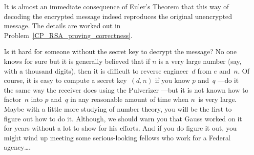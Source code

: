 It is almost an immediate consequence of Euler's Theorem that this way
of decoding the encrypted message indeed reproduces the original
unencrypted message.  The details are worked out in
Problem~\ref{CP_RSA_proving_correctness}.





\iffalse
In order to check that this is the
case, we need to show that the decryption
$\rem{(m^*)^d}{n}$ is indeed equal to the sender's message~$m$.  Since
$m^* = \rem{m^e}{n}$, \ $m^*$ is congruent to~$m^e$ modulo~$n$ by
Corollary~\ref{aran}.  That is,
\begin{equation*}
    m^* \equiv m^e \pmod n.
\end{equation*}
By raising both sides to the power~$d$, we obtain the congruence
\begin{equation}\label{eq:RSAx1}
    (m^*)^d \equiv m^{ed} \pmod n.
\end{equation}
The encryption exponent~$e$ and the decryption exponent~$d$ are chosen
such that $de \equiv 1 \pmod{(p - 1)(q - 1)}$.  So, there exists an
integer~$r$ such that $ed = 1 + r(p - 1)(q - 1)$.  By substituting $1
+ r(p - 1)(q - 1)$ for~$ed$ in Equation~\ref{eq:RSAx1}, we obtain
\begin{equation}\label{eq:RSAx2}
    (m^*)^d \equiv m \cdot m^{r(p - 1)(q - 1)} \pmod n.
\end{equation}

By Euler's Theorem and the assumption that $\gcd(m, n) = 1$, we know
that
\begin{equation*}
    m^{\phi(n)} \equiv 1 \pmod n.
\end{equation*}
From Corollary~\ref{cor:H7}, we know that $\phi(n) = (p - 1)(q - 1)$.
Hence,
\begin{align*}
(m^*)^d  &= m \cdot m^{r(p-1)(q-1)} \pmod{n} \\
        &= m \cdot 1^{r} \pmod{n} \\
        &= m \pmod{n}.
\end{align*}
Hence, the decryption process indeed reproduces the original
message~$m$.
\fi


Is it hard for someone without the secret key to decrypt the message?
No one knows for sure but it is generally believed that if $n$ is a
very large number (say, with a thousand digits), then it is difficult
to reverse engineer~$d$ from $e$ and~$n$.  Of course, it is easy to
compute a secret key~$(d, n)$ if you know $p$ and~$q$ ---do it the
same way the receiver does using the Pulverizer ---but it is not known
how to factor~$n$ into $p$ and~$q$ in any reasonable amount of time
when $n$~is very large.  Maybe with a little more studying of number
theory, you will be the first to figure out how to do it.  Although,
we should warn you that Gauss worked on it for years without a lot to
show for his efforts.  And if you do figure it out, you might wind up
meeting some serious-looking fellows who work for a Federal
agency\dots.

